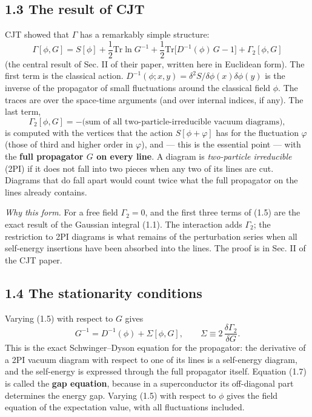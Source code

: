 \documentclass[
  10pt,
]{article}
\begin{document}
\hypertarget{the-result-of-cjt}{%
\subsection{1.3 The result of CJT}\label{the-result-of-cjt}}

CJT showed that \(\Gamma\) has a remarkably simple structure:
\[\boxed{\;\Gamma[\phi,G]=S[\phi]+\frac12\mathrm{Tr}\ln G^{-1}+\frac12\mathrm{Tr}\big[D^{-1}(\phi)\,G-1\big]+\Gamma_2[\phi,G]\;}\tag{1.5}\]
(the central result of Sec. II of their paper, written here in Euclidean
form). The first term is the classical action.
\(D^{-1}(\phi;x,y)=\delta^2S/\delta\phi(x)\delta\phi(y)\) is the inverse
of the propagator of small fluctuations around the classical field
\(\phi\). The traces are over the space-time arguments (and over
internal indices, if any). The last term,
\[\Gamma_2[\phi,G]=-\big(\text{sum of all two-particle-irreducible vacuum diagrams}\big),\tag{1.6}\]
is computed with the vertices that the action \(S[\phi+\varphi]\) has
for the fluctuation \(\varphi\) (those of third and higher order in
\(\varphi\)), and --- this is the essential point --- with the
\textbf{full propagator \(G\) on every line}. A diagram is
\emph{two-particle irreducible} (2PI) if it does not fall into two
pieces when any two of its lines are cut. Diagrams that do fall apart
would count twice what the full propagator on the lines already
contains.

\emph{Why this form.} For a free field \(\Gamma_2=0\), and the first
three terms of (1.5) are the exact result of the Gaussian integral
(1.1). The interaction adds \(\Gamma_2\); the restriction to 2PI
diagrams is what remains of the perturbation series when all self-energy
insertions have been absorbed into the lines. The proof is in Sec. II of
the CJT paper.

\hypertarget{the-stationarity-conditions}{%
\subsection{1.4 The stationarity
conditions}\label{the-stationarity-conditions}}

Varying (1.5) with respect to \(G\) gives
\[G^{-1}=D^{-1}(\phi)+\Sigma[\phi,G],\qquad\Sigma\equiv2\,\frac{\delta\Gamma_2}{\delta G}.\tag{1.7}\]
This is the exact Schwinger--Dyson equation for the propagator: the
derivative of a 2PI vacuum diagram with respect to one of its lines is a
self-energy diagram, and the self-energy is expressed through the full
propagator itself. Equation (1.7) is called the \textbf{gap equation},
because in a superconductor its off-diagonal part determines the energy
gap. Varying (1.5) with respect to \(\phi\) gives the field equation of
the expectation value, with all fluctuations included.
\end{document}
